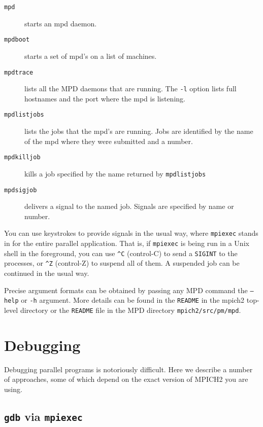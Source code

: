 \documentclass[dvipdfm,11pt]{article}
\begin{document}
\begin{description}
\item[\texttt{mpd}]  starts an mpd daemon.
\item[\texttt{mpdboot}] starts a set of mpd's on a list of machines.
\item[\texttt{mpdtrace}] lists all the MPD daemons that are running.  The
  \texttt{-l} option lists full hostnames and the port where the mpd is
  listening.
\item[\texttt{mpdlistjobs}] lists the jobs that the mpd's are running.
  Jobs are identified by the name of the mpd where they were submitted
  and a number.
\item[\texttt{mpdkilljob}] kills a job specified by the name returned by
  \texttt{mpdlistjobs }
\item[\texttt{mpdsigjob}] delivers a signal to the named job.  Signals
  are specified by name or number.
\end{description}
You can use keystrokes to provide signals in the usual way, where
\texttt{mpiexec} stands in for the entire parallel application.  That
is, if \texttt{mpiexec} is being run in a Unix shell in the foreground,
you can use \verb+^C+ (control-C) to send a \texttt{SIGINT} to the
processes, or \verb+^Z+ (control-Z) to suspend all of them.  A suspended
job can be continued in the usual way.

Precise argument formats can be obtained by passing any MPD command the
\texttt{--help} or \texttt{-h} argument.  More details can be found in
the \texttt{README} in the mpich2 top-level directory or the
\texttt{README} file in the MPD directory \texttt{mpich2/src/pm/mpd}.


\section{Debugging}
\label{sec:debugging}

Debugging parallel programs is notoriously difficult.  Here we describe
a number of approaches, some of which depend on the exact version of
MPICH2 you are using. 


\subsection{\texttt{gdb} via \texttt{mpiexec}}
\label{sec:gdb via mpiexec}
\end{document}
